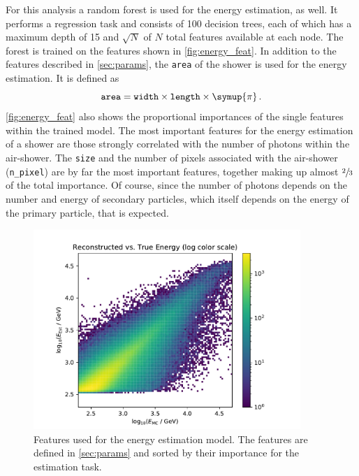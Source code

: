 For this analysis a random forest is used for the energy estimation, as well.
It performs a regression task and consists of \num{100} decision trees, each of which has a maximum depth of \num{15} and $\sqrt{N}$ of $N$ total features available at each node. The forest is trained on the
features shown in \autoref{fig:energy_feat}. In addition to the features described in \autoref{sec:params}, the \texttt{area} of the shower is used for the energy estimation. It is defined as
%
\begin{equation}
  \texttt{area} = \texttt{width}\times\texttt{length}\times\symup{\pi}\, .
\end{equation}
%
\autoref{fig:energy_feat} also shows the
proportional importances of the single features within the trained model. The
most important features for the energy estimation of a shower are those
strongly correlated with the number of photons within the air-shower. The
\texttt{size} and the number of pixels associated with the air-shower
(\texttt{n\_pixel}) are by far the most important features, together making up
almost $\sfrac{2}{3}$ of the total importance. Of course, since the number of
photons depends on the number and energy of secondary particles, which itself
depends on the energy of the primary particle, that is expected.
%
\begin{figure}
  \centering
  \includegraphics[width=0.9\textwidth, page=4]{Plots/results/DBSCAN/energy_performance.pdf}
  \caption{Features used for the energy estimation model. The features are defined in \autoref{sec:params} and sorted by their importance for the estimation task.}
  \label{fig:energy_feat}
\end{figure}
%


